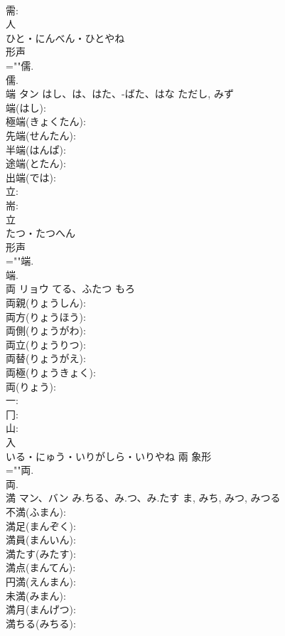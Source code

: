 \documentclass[8pt]{extreport}
\begin{document}
\begin{CJK}{UTF8}{min}
\\	需: 
\\	人	
\\	ひと・にんべん・ひとやね	
\\	形声 
\\	=""儒.
\\	儒.
\\	端	タン	はし、は、はた、-ばた、はな	ただし, みず	
\\	端(はし): 
\\	極端(きょくたん): 
\\	先端(せんたん): 
\\	半端(はんぱ): 
\\	途端(とたん): 
\\	出端(では): 
\\	立: 
\\	耑: 
\\	立	
\\	たつ・たつへん	
\\	形声 
\\	=""端.
\\	端.
\\	両	リョウ	てる、ふたつ	もろ	
\\	両親(りょうしん): 
\\	両方(りょうほう): 
\\	両側(りょうがわ): 
\\	両立(りょうりつ): 
\\	両替(りょうがえ): 
\\	両極(りょうきょく): 
\\	両(りょう): 
\\	一: 
\\	冂: 
\\	山: 
\\	入	
\\	いる・にゅう・いりがしら・いりやね	兩	象形 
\\	=""両.
\\	両.
\\	満	マン、バン	み.ちる、み.つ、み.たす	ま, みち, みつ, みつる	
\\	不満(ふまん): 
\\	満足(まんぞく): 
\\	満員(まんいん): 
\\	満たす(みたす): 
\\	満点(まんてん): 
\\	円満(えんまん): 
\\	未満(みまん): 
\\	満月(まんげつ): 
\\	満ちる(みちる): 

\end{CJK}
\end{document}
